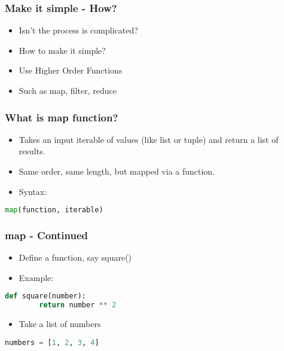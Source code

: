\documentclass[14pt]{beamer}
\begin{document}
    \begin{frame}[containsverbatim]
        \frametitle{Make it simple - How?}
        \begin{itemize}
        \item Isn't the process is complicated?
        \item How to make it simple?
		\item Use Higher Order Functions 
        \item \alert {Such as map, filter, reduce}
        \end{itemize}
    \end{frame}
    
    \begin{frame}[containsverbatim]
        \frametitle{What is map function?}
        \begin{itemize}
            \item Takes an input iterable of values (like list or tuple) and return a list of results. 
            \item Same order, same length, but mapped via a function.
            \item \alert{Syntax:}
        \end{itemize}
        \begin{lstlisting}[language=Python]
	map(function, iterable)    
        \end{lstlisting}
    \end{frame}
    
    \begin{frame}[containsverbatim]
        \frametitle{map - Continued}
        \begin{itemize}
            \item Define a function, say square()
            \item \alert{Example:}
        \end{itemize}
        \begin{lstlisting}[language=Python]
	def square(number):
		return number ** 2
        \end{lstlisting}

        \begin{itemize}        
        \item \alert {Take a list of numbers}
        \end{itemize}        
        \begin{lstlisting}[language=Python]
	numbers = [1, 2, 3, 4]
        \end{lstlisting}
    \end{frame}
\end{document}
